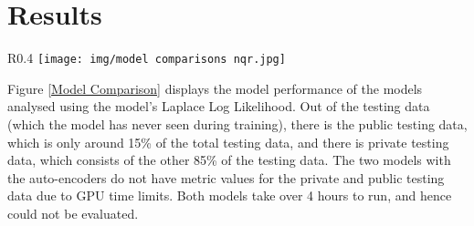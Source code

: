 \documentclass[12pt]{article}
\begin{document}
\section{Results}



\begin{wrapfigure}{R}{0.4\textwidth}
    \centering
    \texttt{[image: img/model comparisons nqr.jpg]}
    
    \caption{Comparison of Average Model LLL}
    \label{Model Comparison}
\end{wrapfigure}

Figure \ref{Model Comparison} displays the model performance of the models analysed using the model's Laplace Log Likelihood.
Out of the testing data (which the model has never seen during training), there is the public testing data, which is only around 15\% of the total testing data, and there is private testing data, which consists of the other 85\% of the testing data.
The two models with the auto-encoders do not have metric values for the private and public testing data due to GPU time limits.
Both models take over 4 hours to run, and hence could not be evaluated.
\end{document}

